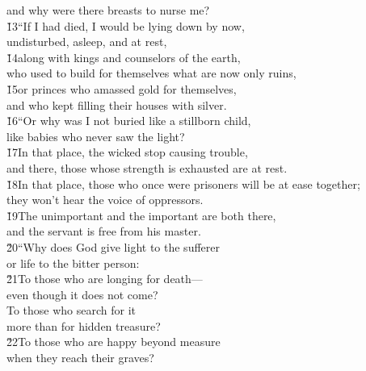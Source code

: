 \begin{poetry}
\poemll    and why were there breasts to nurse me? \\
\poeml \v{13}``If I had died, I would be lying down by now, \\
\poemll    undisturbed, asleep, and at rest, \\
\poeml \v{14}along with kings and counselors of the earth, \\
\poemll    who used to build for themselves what are now only ruins, \\
\poeml \v{15}or princes who amassed gold for themselves, \\
\poemll    and who kept filling their houses with silver. \\
\poeml \v{16}``Or why was I not buried like a stillborn child, \\
\poemll    like babies who never saw the light? \\
\poeml \v{17}In that place, the wicked stop causing trouble, \\
\poemll    and there, those whose strength is exhausted are at rest. \\
\poeml \v{18}In that place, those who once were prisoners will be at ease together; \\
\poemll    they won't hear the voice of oppressors. \\
\poeml \v{19}The unimportant and the important are both there, \\
\poemll    and the servant is free from his master. \\
\poeml \v{20}``Why does God give light to the sufferer \\
\poemll    or life to the bitter person: \\
\poeml \v{21}To those who are longing for death--- \\
\poemll    even though it does not come? \\
\poeml To those who search for it \\
\poemll    more than for hidden treasure? \\
\poeml \v{22}To those who are happy beyond measure \\
\poemll    when they reach their graves? \\

\end{poetry}
